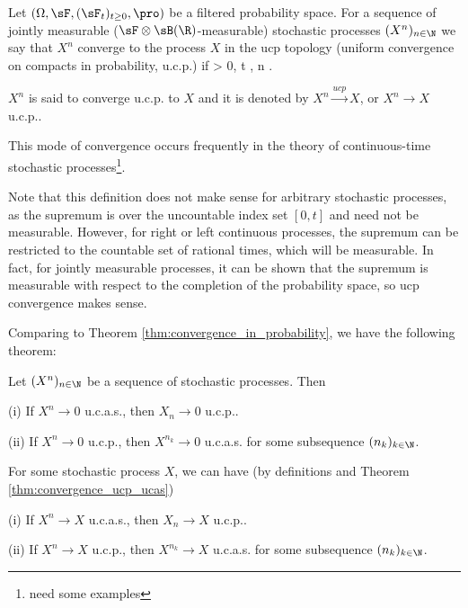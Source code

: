\begin{definition}\label{def:ucp_convergence_process}
Let $(\Omega,\sF,(\sF_t)_{t\geq 0},\pro)$ be a filtered probability space. For a sequence of jointly measurable ($\sF\otimes \sB(\R)$-measurable) stochastic processes $(X^n)_{n\in \N}$ we say that $X^n$ converge to the process $X$ in the ucp topology (uniform convergence on compacts in probability, u.c.p.) if
\be
\forall \ve > 0, \forall t ,\quad \pro{}  \quad {}n \to\infty.
\ee

$X^n$ is said to converge u.c.p. to $X$ and it is denoted by $X^n \xrightarrow{ucp}X$, or $X^n \to X$ u.c.p..
\end{definition}

\begin{remark}
This mode of convergence occurs frequently in the theory of continuous-time stochastic processes\footnote{need some examples}.

Note that this definition does not make sense for arbitrary stochastic processes, as the supremum is over the uncountable index set $[0,t]$ and need not be measurable. However, for right or left continuous processes, the supremum can be restricted to the countable set of rational times, which will be measurable. In fact, for jointly measurable processes, it can be shown that the supremum is measurable with respect to the completion of the probability space, so ucp convergence makes sense.
\end{remark}

Comparing to Theorem \ref{thm:convergence_in_probability}, we have the following theorem:

\begin{theorem}\label{thm:convergence_ucp_ucas}%
Let $(X^n)_{n \in \N}$ be a sequence of stochastic processes. Then
\ben
\item [(i)] If $X^n \to 0$ u.c.a.s., then $X_n \to 0$ u.c.p..
\item [(ii)] If $X^n \to 0$ u.c.p., then $X^{n_k}\to 0$ u.c.a.s. for some subsequence $(n_k)_{k\in \N}$.
\een
\end{theorem}

\begin{remark}
For some stochastic process $X$, we can have (by definitions and Theorem \ref{thm:convergence_ucp_ucas})
\ben
\item [(i)] If $X^n \to X$ u.c.a.s., then $X_n \to X$ u.c.p..
\item [(ii)] If $X^n \to X$ u.c.p., then $X^{n_k}\to X$ u.c.a.s. for some subsequence $(n_k)_{k\in \N}$.
\een
\end{remark}

